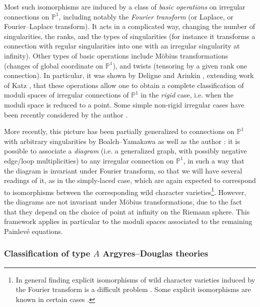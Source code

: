 \documentclass[11pt,a4paper]{amsart}
\numberwithin{equation}{section}
\begin{document}
Most such isomorphisms are induced by a class of \emph{basic operations} on irregular connections on $\mathbb P^1$, including notably the \emph{Fourier transform} (or Laplace, or Fourier--Laplace transform). It acts in a complicated way, changing the number of singularities, the ranks, and the types of singularities (for instance it transforms a connection with regular singularities into one with an irregular singularity at infinity). Other types of basic operations include Möbius transformations (changes of global coordinate on $\mathbb P^1$), and twists (tensoring by a given rank one connection). In particular, it was shown by Deligne and Arinkin \cite{deligne2006letter, arinkin2010rigid}, extending work of Katz \cite{katz1996rigid}, that these operations allow one to obtain a complete classification of moduli spaces of irregular connections of $\mathbb P^1$ in the \emph{rigid} case, i.e. when the moduli space is reduced to a point. Some simple non-rigid irregular cases have been recently considered by the author \cite{doucot2026simplification}.

More recently, this picture has been partially generalized to connections on $\mathbb P^1$ with arbitrary singularities by Boalch--Yamakawa as well as the author \cite{boalch2020diagrams, doucot2021diagrams, doucot2024basic}: it is possible to associate a \emph{diagram} (i.e. a generalized graph, with possibly negative edge/loop multiplicities) to any irregular connection on $\mathbb P^1$, in such a way that the diagram is invariant under Fourier transform, so that we will have several readings of it, as in the simply-laced case, which are again expected to correspond to isomorphisms between the corresponding wild character varieties\footnote{In general finding explicit isomorphisms of wild character varieties induced by the Fourier transform is a difficult problem \cite{malgrange1991equations, mochizuki2010note, mochizuki2018stokes}. Some explicit isomorphisms are known in certain cases \cite{balser1981reduction,sabbah2016differential,boalch2016global,dagnolo2020topological, hohl2022d_modules,doucot2025topological}.}. However, the diagrams are not invariant under Möbius transformations, due to the fact that they depend on the choice of point at infinity on the Riemann sphere. This framework applies in particular to the moduli spaces associated to the remaining Painlevé equations.




\subsubsection{Classification of type $A$ Argyres--Douglas theories}
\end{document}
